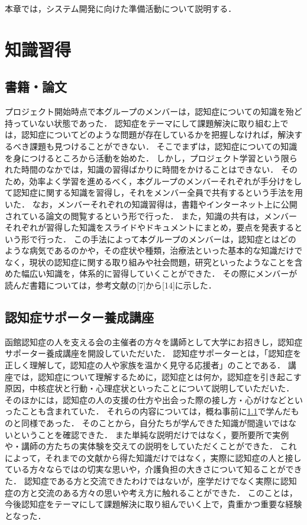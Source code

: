 \documentclass[../report]{subfiles}
\begin{document}
本章では，システム開発に向けた準備活動について説明する．


\section{知識習得}
\subsection{書籍・論文} \label{sec:document-article}
プロジェクト開始時点で本グループのメンバーは，認知症についての知識を殆ど持っていない状態であった．
認知症をテーマにして課題解決に取り組む上では，認知症についてどのような問題が存在しているかを把握しなければ，解決するべき課題も見つけることができない．
そこでまずは，認知症についての知識を身につけるところから活動を始めた．
しかし，プロジェクト学習という限られた時間のなかでは，知識の習得ばかりに時間をかけることはできない．
そのため，効率よく学習を進めるべく，本グループのメンバーそれぞれが手分けをして認知症に関する知識を習得し，それをメンバー全員で共有するという手法を用いた．
なお，メンバーそれぞれの知識習得は，書籍やインターネット上に公開されている論文の閲覧するという形で行った．
また，知識の共有は，メンバーそれぞれが習得した知識をスライドやドキュメントにまとめ，要点を発表するという形で行った．
この手法によって本グループのメンバーは，認知症とはどのような病気であるのかや，その症状や種類，治療法といった基本的な知識だけでなく，現状の認知症に関する取り組みや社会問題，研究といったようなことを含めた幅広い知識を，体系的に習得していくことができた．
その際にメンバーが読んだ書籍については，参考文献の[7]から[14]に示した．

\subsection{認知症サポーター養成講座}
函館認知症の人を支える会の主催者の方々を講師として大学にお招きし，認知症サポーター養成講座を開設していただいた．
認知症サポーターとは，「認知症を正しく理解して，認知症の人や家族を温かく見守る応援者」のことである．
講座では，認知症について理解するために，認知症とは何か，認知症を引き起こす原因，中核症状と行動・心理症状といったことについて説明していただいた．
そのほかには，認知症の人の支援の仕方や出会った際の接し方・心がけなどといったことも含まれていた．
それらの内容については，概ね事前に\ref{sec:document-article}で学んだものと同様であった．
そのことから，自分たちが学んできた知識が間違いではないということを確認できた．
また単純な説明だけではなく，要所要所で実例や・講師の方たちの実体験を交えての説明をしていただくことができた．
これによって，それまでの文献から得た知識だけではなく，実際に認知症の人と接している方々ならではの切実な思いや，介護負担の大きさについて知ることができた．
認知症である方と交流できたわけではないが，座学だけでなく実際に認知症の方と交流のある方々の思いや考え方に触れることができた．
このことは，今後認知症をテーマにして課題解決に取り組んでいく上で，貴重かつ重要な経験となった．
\end{document}
